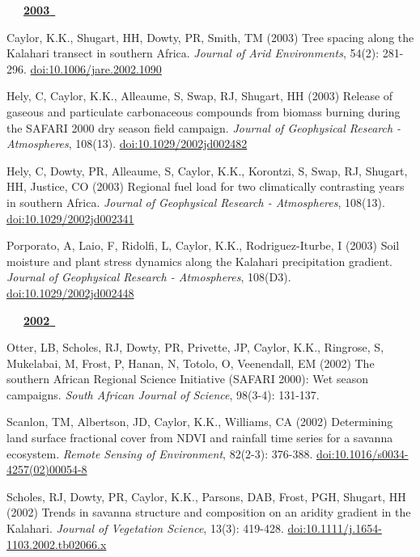 \begin{etaremune}
\mbox{\ \ \ \underline{\textbf{2003 }}}

\item Caylor, K.K., Shugart, HH, Dowty, PR, Smith, TM (2003) Tree spacing along the Kalahari transect in southern Africa. \emph{Journal of Arid Environments}, 54(2): 281-296. \href{https://doi.org/10.1006/jare.2002.1090}{doi:10.1006/jare.2002.1090}
\item Hely, C, Caylor, K.K., Alleaume, S, Swap, RJ, Shugart, HH (2003) Release of gaseous and particulate carbonaceous compounds from biomass burning during the SAFARI 2000 dry season field campaign. \emph{Journal of Geophysical Research - Atmospheres}, 108(13). \href{https://doi.org/10.1029/2002jd002482}{doi:10.1029/2002jd002482}
\item Hely, C, Dowty, PR, Alleaume, S, Caylor, K.K., Korontzi, S, Swap, RJ, Shugart, HH, Justice, CO (2003) Regional fuel load for two climatically contrasting years in southern Africa. \emph{Journal of Geophysical Research - Atmospheres}, 108(13). \href{https://doi.org/10.1029/2002jd002341}{doi:10.1029/2002jd002341}
\item Porporato, A, Laio, F, Ridolfi, L, Caylor, K.K., Rodriguez-Iturbe, I (2003) Soil moisture and plant stress dynamics along the Kalahari precipitation gradient. \emph{Journal of Geophysical Research - Atmospheres}, 108(D3). \href{https://doi.org/10.1029/2002jd002448}{doi:10.1029/2002jd002448}

\mbox{\ \ \ \underline{\textbf{2002 }}}

\item Otter, LB, Scholes, RJ, Dowty, PR, Privette, JP, Caylor, K.K., Ringrose, S, Mukelabai, M, Frost, P, Hanan, N, Totolo, O, Veenendall, EM (2002) The southern African Regional Science Initiative (SAFARI 2000): Wet season campaigns. \emph{South African Journal of Science}, 98(3-4): 131-137. 
\item Scanlon, TM, Albertson, JD, Caylor, K.K., Williams, CA (2002) Determining land surface fractional cover from NDVI and rainfall time series for a savanna ecosystem. \emph{Remote Sensing of Environment}, 82(2-3): 376-388. \href{https://doi.org/10.1016/s0034-4257(02)00054-8}{doi:10.1016/s0034-4257(02)00054-8}
\item Scholes, RJ, Dowty, PR, Caylor, K.K., Parsons, DAB, Frost, PGH, Shugart, HH (2002) Trends in savanna structure and composition on an aridity gradient in the Kalahari. \emph{Journal of Vegetation Science}, 13(3): 419-428. \href{https://doi.org/10.1111/j.1654-1103.2002.tb02066.x}{doi:10.1111/j.1654-1103.2002.tb02066.x}

\end{etaremune}
